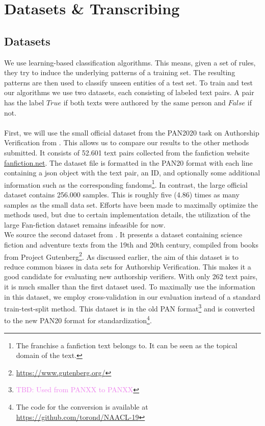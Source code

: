 \chapter{Datasets \& Transcribing}\label{ch:datasets}
\section{Datasets}
We use learning-based classification algorithms.
This means, given a set of rules, they try to induce the underlying patterns of a training set.
The resulting patterns are then used to classify unseen entities of a test set.
To train and test our algorithms we use two datasets, each consisting of labeled text pairs.
A pair has the label $True$ if both texts were authored by the same person and $False$ if not.\\\\
First, we will use the small official dataset from the PAN2020 task on Authorship Verification from \cite{bevendorff2020overview}.
This allows us to compare our results to the other methods submitted.
It consists of 52.601 text pairs collected from the fanfiction website \url{fanfiction.net}.
The dataset file is formatted in the PAN20 format with each line containing a json object with the text pair, an ID, and optionally some additional information such as the corresponding fandoms\footnote{The franchise a fanfiction text belongs to. It can be seen as the topical domain of the text.}.
In contrast, the large official dataset contains 256.000 samples.
This is roughly five (4.86) times as many samples as the small data set.
Efforts have been made to maximally optimize the methods used, but due to certain implementation details, the utilization of the large Fan-fiction dataset remains infeasible for now.\\
We source the second dataset from \cite{stein2019unbiasedGutenbergCorpus}.
It presents a dataset containing science fiction and adventure texts from the 19th and 20th century, compiled from books from Project Gutenberg\footnote{\url{https://www.gutenberg.org/}}.
As discussed earlier, the aim of this dataset is to reduce common biases in data sets for Authorship Verification.
This makes it a good candidate for evaluating new authorship verifiers.
With only 262 text pairs, it is much smaller than the first dataset used.
To maximally use the information in this dataset, we employ cross-validation in our evaluation instead of a standard train-test-split method.
This dataset is in the old PAN format\footnote{\textcolor{violet}{TBD: Used from PANXX to PANXX}} and is converted to the new PAN20 format for standardization\footnote{The code for the conversion is available at \url{https://github.com/torond/NAACL-19}}.\\


